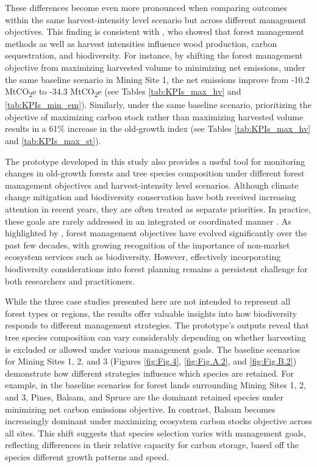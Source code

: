 \documentclass[preprint,12pt]{elsarticle}
\begin{document}
These differences become even more pronounced when comparing outcomes within the same harvest-intensity level scenario but across different management objectives. This finding is consistent with \citet{Makela2023}, who showed that forest management methods as well as harvest intensities influence wood production, carbon sequestration, and biodiversity. For instance, by shifting the forest management objective from maximizing harvested volume to minimizing net emissions, under the same baseline scenario in Mining Site 1, the net emissions improve from -10.2  MtCO\textsubscript{2}e to -34.3  MtCO\textsubscript{2}e (see Tables \ref{tab:KPIs_max_hv} and \ref{tab:KPIs_min_em}). Similarly, under the same baseline scenario, prioritizing the objective of maximizing carbon stock rather than maximizing harvested volume results in a 61\% increase in the old-growth index (see Tables \ref{tab:KPIs_max_hv} and \ref{tab:KPIs_max_st}).

The prototype developed in this study also provides a useful tool for monitoring changes in old-growth forests and tree species composition under different forest management objectives and harvest-intensity level scenarios. Although climate change mitigation and biodiversity conservation have both received increasing attention in recent years, they are often treated as separate priorities. In practice, these goals are rarely addressed in an integrated or coordinated manner \citep{Diaz2009}.
As highlighted by \citet{ezquerro2016operational}, forest management objectives have evolved significantly over the past few decades, with growing recognition of the importance of non-market ecosystem services such as biodiversity. However, effectively incorporating biodiversity considerations into forest planning remains a persistent challenge for both researchers and practitioners.

While the three case studies presented here are not intended to represent all forest types or regions, the results offer valuable insights into how biodiversity responds to different management strategies. The prototype’s outputs reveal that tree species composition can vary considerably depending on whether harvesting is excluded or allowed under various management goals. The baseline scenarios for Mining Sites 1, 2, and 3 (Figures \ref{fig:Fig.4}, \ref{fig:Fig.A.2}, and \ref{fig:Fig.B.2}) demonstrate how different strategies influence which species are retained. For example, in the baseline scenarios for forest lands surrounding Mining Sites 1, 2, and 3, Pines, Balsam, and Spruce are the dominant retained species under minimizing net carbon emissions objective. In contrast, Balsam becomes increasingly dominant under maximizing ecosystem carbon stocks objective across all sites. This shift suggests that species selection varies with management goals, reflecting differences in their relative capacity for carbon storage, based off the species different growth patterns and speed.
\end{document}
